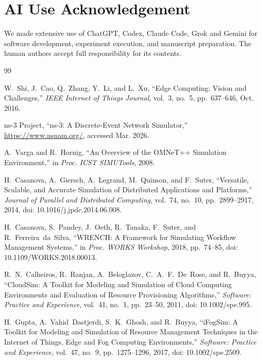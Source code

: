 \documentclass[conference]{IEEEtran}
\begin{document}
\section*{AI Use Acknowledgement}
We made extensive use of ChatGPT, Codex, Claude Code, Grok and Gemini for
software development, experiment execution, and manuscript preparation.
The human authors accept full responsibility for its contents.

\suppressfloats[t]



\begin{thebibliography}{99}

W.~Shi, J.~Cao, Q.~Zhang, Y.~Li, and L.~Xu,
``Edge Computing: Vision and Challenges,''
\emph{IEEE Internet of Things Journal},
vol.~3, no.~5, pp.~637--646, Oct. 2016.

{ns-3 Project},
``ns-3: A Discrete-Event Network Simulator,''
\url{https://www.nsnam.org/}, accessed Mar. 2026.

A.~Varga and R.~Hornig,
``An Overview of the OMNeT++ Simulation Environment,''
in \emph{Proc. ICST SIMUTools}, 2008.

H.~Casanova, A.~Giersch, A.~Legrand, M.~Quinson, and F.~Suter,
``Versatile, Scalable, and Accurate Simulation of Distributed Applications
and Platforms,''
\emph{Journal of Parallel and Distributed Computing},
vol.~74, no.~10, pp.~2899--2917, 2014, doi: 10.1016/j.jpdc.2014.06.008.

H.~Casanova, S.~Pandey, J.~Oeth, R.~Tanaka, F.~Suter, and R.~Ferreira~da~Silva,
``WRENCH: A Framework for Simulating Workflow Management Systems,''
in \emph{Proc. WORKS Workshop}, 2018, pp.~74--85, doi: 10.1109/WORKS.2018.00013.

R.~N.~Calheiros, R.~Ranjan, A.~Beloglazov, C.~A.~F.~De~Rose, and R.~Buyya,
``CloudSim: A Toolkit for Modeling and Simulation of Cloud Computing
Environments and Evaluation of Resource Provisioning Algorithms,''
\emph{Software: Practice and Experience},
vol.~41, no.~1, pp.~23--50, 2011, doi: 10.1002/spe.995.

H.~Gupta, A.~Vahid~Dastjerdi, S.~K.~Ghosh, and R.~Buyya,
``iFogSim: A Toolkit for Modeling and Simulation of Resource Management
Techniques in the Internet of Things, Edge and Fog Computing Environments,''
\emph{Software: Practice and Experience},
vol.~47, no.~9, pp.~1275--1296, 2017, doi: 10.1002/spe.2509.


\end{thebibliography}
\end{document}
